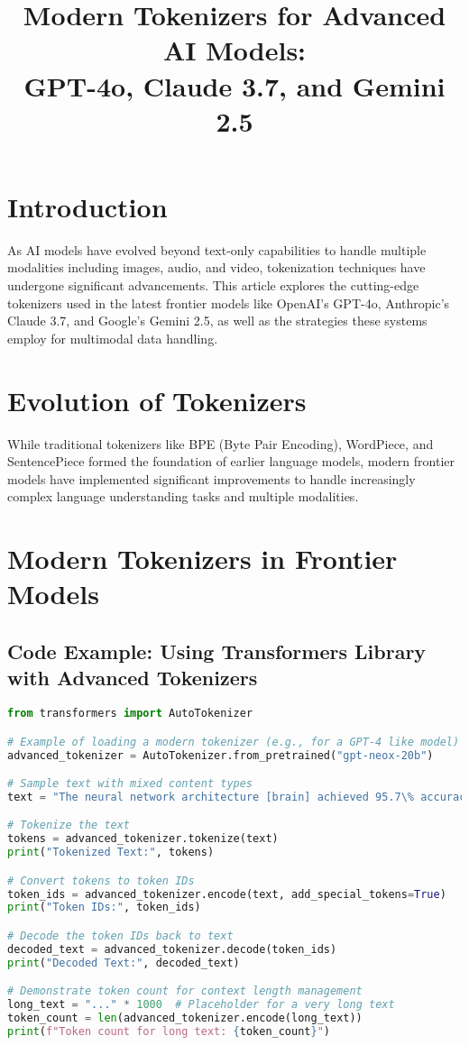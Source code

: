 \documentclass{article}
\title{Modern Tokenizers for Advanced AI Models:\\GPT-4o, Claude 3.7, and Gemini 2.5}
\author{}
\date{}
\begin{document}
\maketitle

\section{Introduction}
As AI models have evolved beyond text-only capabilities to handle multiple modalities including images, audio, and video, tokenization techniques have undergone significant advancements. This article explores the cutting-edge tokenizers used in the latest frontier models like OpenAI's GPT-4o, Anthropic's Claude 3.7, and Google's Gemini 2.5, as well as the strategies these systems employ for multimodal data handling.

\section{Evolution of Tokenizers}
While traditional tokenizers like BPE (Byte Pair Encoding), WordPiece, and SentencePiece formed the foundation of earlier language models, modern frontier models have implemented significant improvements to handle increasingly complex language understanding tasks and multiple modalities.

\section{Modern Tokenizers in Frontier Models}
\subsection{Code Example: Using Transformers Library with Advanced Tokenizers}

\begin{lstlisting}[language=Python]
from transformers import AutoTokenizer

# Example of loading a modern tokenizer (e.g., for a GPT-4 like model)
advanced_tokenizer = AutoTokenizer.from_pretrained("gpt-neox-20b")

# Sample text with mixed content types
text = "The neural network architecture [brain] achieved 95.7\% accuracy on the benchmark dataset."

# Tokenize the text
tokens = advanced_tokenizer.tokenize(text)
print("Tokenized Text:", tokens)

# Convert tokens to token IDs
token_ids = advanced_tokenizer.encode(text, add_special_tokens=True)
print("Token IDs:", token_ids)

# Decode the token IDs back to text
decoded_text = advanced_tokenizer.decode(token_ids)
print("Decoded Text:", decoded_text)

# Demonstrate token count for context length management
long_text = "..." * 1000  # Placeholder for a very long text
token_count = len(advanced_tokenizer.encode(long_text))
print(f"Token count for long text: {token_count}")
\end{lstlisting}
\end{document}
